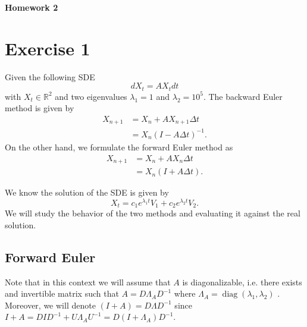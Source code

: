 \documentclass[a4paper,12pt]{article} %
\DeclareMathOperator{\diag}{diag}
\begin{document}
\begin{center} %
    {\Large \bf Homework 2}
\end{center}

\vspace{0.4cm}


\onehalfspacing
\section{Exercise 1}
Given the following SDE
\begin{equation}
    dX_t =A X_t dt
\end{equation}
with \(X_t \in \mathbb{R}^2\) and two eigenvalues \(\lambda_1=1\) and \(\lambda _2=10^5\).
The backward Euler method is given by
\begin{align}
    X_{n+1} & =X_n + A  X_{n+1} \Delta t    \\
            & = X_n(I - A \Delta t)^{-1}  .
\end{align}
On the other hand, we formulate the forward Euler method as
\begin{align}
    X_{n+1} & = X_n + A X_n \Delta t \\
            & = X_n(I + A \Delta t).
\end{align}

We know the solution of the SDE is given by
\begin{equation}
    X_t = c_1 e^{\lambda_1 t} V_1 + c_2 e^{\lambda_2 t} V_2.
\end{equation}
We will study the behavior of the two methods and evaluating it against the real solution.
\subsection{Forward Euler}
Note that in this context we will assume that \(A\) is diagonalizable, i.e. there exists and invertible matrix such that \(A = D \Lambda_A D^{-1} \) where \(\Lambda _A = \diag  (\lambda _1, \lambda _2)\) .  Moreover, we will denote \((I+A) = D \Lambda D ^{-1} \) since \(I+A=D I D ^{-1} + U \Lambda_A U ^{-1} = D (I+ \Lambda _A)D ^{-1} \).
\end{document}
